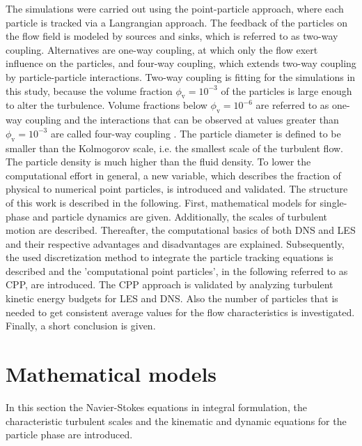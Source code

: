 \documentclass[11pt,a4paper,openany,oneside,parskip=half*]{article}
\begin{document}
\newline
The simulations were carried out using the point-particle approach, where each particle is tracked via a Langrangian approach. The feedback of the particles on the flow field is modeled by sources and sinks, which is referred to as two-way coupling. Alternatives are one-way coupling, at which only the flow exert influence on the particles, and four-way coupling, which extends two-way coupling by particle-particle interactions. Two-way coupling is fitting for the simulations in this study, because the volume fraction $\phi_\mathrm{v}= 10^{-3}$ of the particles is large enough to alter the turbulence. Volume fractions below $\phi_\mathrm{v}= 10^{-6}$ are referred to as one-way coupling and the interactions that can be observed at values greater than $\phi_\mathrm{v}= 10^{-3}$ are called four-way coupling \cite{particleladenTurbulentFlows:DirectSimulationAndClosureModels}\cite{OnPredictingParticle-LadenTurbulentFlows}.
The particle diameter is defined to be smaller than the Kolmogorov scale, i.e. the smallest scale of the turbulent flow. The particle density is much higher than the fluid density.
\newline
To lower the computational effort in general, a new variable, which describes the fraction of physical to numerical point particles, is introduced and validated.
\newline
The structure of this work is described in the following. 
First, mathematical models for single-phase and particle dynamics are given. 
Additionally, the scales of turbulent motion are described.
Thereafter, the computational basics of both DNS and LES and their respective advantages and disadvantages are explained.
Subsequently, the used discretization method to integrate the particle tracking equations is described and the 'computational point particles', in the following referred to as CPP, are introduced. 
The CPP approach is validated by analyzing turbulent kinetic energy budgets for LES and DNS.
Also the number of particles that is needed to get consistent average values for the flow characteristics is investigated.
Finally, a short conclusion is given.
\pagebreak
\section{Mathematical models}
In this section the Navier-Stokes equations in integral formulation, the characteristic turbulent scales and the kinematic and dynamic equations for the particle phase are introduced.
\newline
\end{document}
